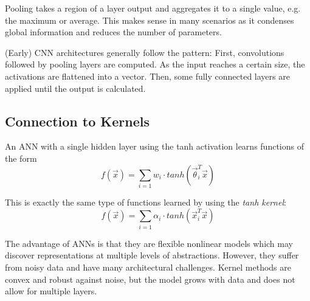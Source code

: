 Pooling takes a region of a layer output
and aggregates it to a single value,
e.g. the maximum or average.
This makes sense in many scenarios as it condenses
global information and reduces the number of parameters.

(Early) CNN architectures generally follow the pattern:
First, convolutions followed by pooling layers are computed.
As the input reaches a certain size,
the activations are flattened into a vector.
Then, some fully connected layers are applied until the
output is calculated.


\subsection{Connection to Kernels}

An ANN with a single hidden layer using the tanh activation
learns functions of the form
\begin{equation*}
    f(\vec{x}) = \sum_{i=1}{w_i \cdot tanh(\vec{\theta}_i^T \vec{x})}
\end{equation*}

This is exactly the same type of functions learned by using the
\emph{tanh kernel}:
\begin{equation*}
    f(\vec{x}) = \sum_{i=1}{\alpha_i \cdot tanh(
        \vec{x}_i^T \vec{x}
    )}
\end{equation*}

The advantage of ANNs is that they are flexible nonlinear
models which may discover representations at multiple
levels of abstractions.
However, they suffer from noisy data and have many
architectural challenges.
Kernel methods are convex and robust against noise,
but the model grows with data and does not allow
for multiple layers.
